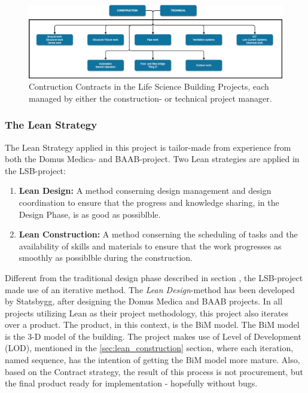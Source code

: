 \begin{figure}
    \centering
    \includegraphics[width=\textwidth]{fig/LVB_contracts.png}
    \caption{Contruction Contracts in the Life Science Building Projects, each managed by either the construction- or technical project manager.}
    \label{fig:project_contracts}
\end{figure}

\subsubsection*{The Lean Strategy}
The Lean Strategy applied in this project is tailor-made from experience from both the Domus Medica- and BAAB-project. Two Lean strategies are applied in the LSB-project: 

\begin{enumerate}
    \item \textbf{Lean Design:} A method conserning design management and design coordination to ensure that the progress and knowledge sharing, in the Design Phase, is as good as possiblble.
    \item \textbf{Lean Construction:} A method conserning the scheduling
    of tasks and the availability of skills and materials to ensure that the work progresses as smoothly as possiblble during the construction.
\end{enumerate}

Different from the traditional design phase described in section , the LSB-project made use of an iterative method. The \textit{Lean Design}-method has been developed by Statsbygg, after designing the Domus Medica and BAAB projects. In all projects utilizing Lean as their project methodology, this project also iterates over a product. The product, in this context, is the BiM model. The BiM model is the 3-D model of the building. The project makes use of Level of Development (LOD), mentioned in the \ref{sec:lean_construction} section, where each iteration, named sequence, has the intention of getting the BiM model more mature. Also, based on the Contract strategy, the result of this process is not procurement, but the final product ready for implementation - hopefully without bugs. 

